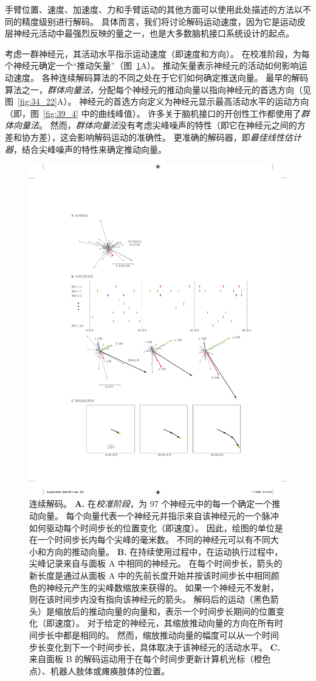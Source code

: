 手臂位置、速度、加速度、力和手臂运动的其他方面可以使用此处描述的方法以不同的精度级别进行解码。
具体而言，我们将讨论解码运动速度，因为它是运动皮层神经元活动中最强烈反映的量之一，也是大多数脑机接口系统设计的起点。


考虑一群神经元，其活动水平指示运动速度（即速度和方向）。
在校准阶段，为每个神经元确定一个“推动矢量”（图~\ref{fig:39_6}A）。
推动矢量表示神经元的活动如何影响运动速度。 各种连续解码算法的不同之处在于它们如何确定推送向量。
最早的解码算法之一，\textit{群体向量法}，分配每个神经元的推动向量以指向神经元的首选方向（见图~\ref{fig:34_22}A）。
神经元的首选方向定义为神经元显示最高活动水平的运动方向（即，图~\ref{fig:39_4} 中的曲线峰值）。
许多关于脑机接口的开创性工作都使用了\textit{群体向量法}。
然而，\textit{群体向量法}没有考虑尖峰噪声的特性（即它在神经元之间的方差和协方差），这会影响解码运动的准确性。
更准确的解码器，即\textit{最佳线性估计器}，结合尖峰噪声的特性来确定推动向量。


\begin{figure}[htbp]
	\centering
	\includegraphics[width=0.5\linewidth]{chap39/fig_39_6}
	\caption{连续解码。
		\textbf{A.} 在\textit{校准阶段}，为 97 个神经元中的每一个确定一个推动向量。
		每个向量代表一个神经元并指示来自该神经元的一个脉冲如何驱动每个时间步长的位置变化（即速度）。
		因此，绘图的单位是在一个时间步长内每个尖峰的毫米数。
		不同的神经元可以有不同大小和方向的推动向量。
		\textbf{B.} 在持续使用过程中，在运动执行过程中，尖峰记录来自与面板 A 中相同的神经元。
		在每个时间步长，箭头的新长度是通过从面板 A 中的先前长度开始并按该时间步长中相同颜色的神经元产生的尖峰数缩放来获得的。
		如果一个神经元不发射，则在该时间步内没有指向该神经元的箭头。
		解码后的运动（黑色箭头）是缩放后的推动向量的向量和，表示一个时间步长期间的位置变化（即速度）。
		对于给定的神经元，其缩放推动向量的方向在所有时间步长中都是相同的。
		然而，缩放推动向量的幅度可以从一个时间步长变化到下一个时间步长，具体取决于该神经元的活动水平。
		\textbf{C.} 来自面板 B 的解码运动用于在每个时间步更新计算机光标（橙色点）、机器人肢体或瘫痪肢体的位置。}
	\label{fig:39_6}
\end{figure}


